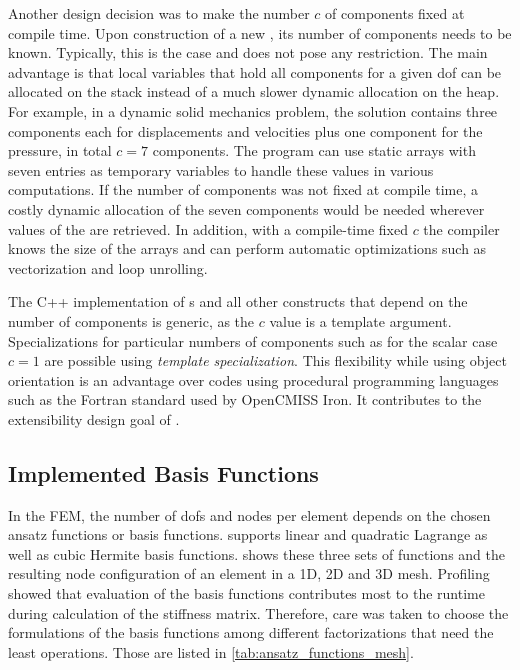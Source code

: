 Another design decision was to make the number $c$ of components fixed at compile time. 
Upon construction of a new , its number of components needs to be known. Typically, this is the case and does not pose any restriction.
The main advantage is that local variables that hold all components for a given dof can be allocated on the stack instead of a much slower dynamic allocation on the heap. For example, in a dynamic solid mechanics problem, the solution  contains three components each for displacements and velocities plus one component for the pressure, in total $c=7$ components. The program can use static arrays with seven entries as temporary variables to handle these values in various computations. If the number of components was not fixed at compile time, a costly dynamic allocation of the seven components would be needed wherever values of the  are retrieved. 
In addition, with a compile-time fixed $c$ the compiler knows the size of the arrays and can perform automatic optimizations such as vectorization and loop unrolling.

The C++ implementation of s and all other constructs that depend on the number of components is generic, as the  $c$ value is a template argument. Specializations for particular numbers of components such as for the scalar case $c=1$ are possible using \emph{template specialization}.
This flexibility while using object orientation is an advantage over codes using procedural programming languages such as the Fortran standard used by OpenCMISS Iron. It contributes to the extensibility design goal of \opendihu.

\subsection{Implemented Basis Functions}

In the FEM, the number of dofs and nodes per element depends on the chosen ansatz functions or basis functions. \Opendihu{} supports linear and quadratic Lagrange as well as cubic Hermite basis functions. 
 shows these three sets of functions and the resulting node configuration of an element in a 1D, 2D and 3D mesh.
Profiling showed that evaluation of the basis functions contributes most to the runtime during calculation of the stiffness matrix. Therefore, care was taken to choose the formulations of the basis functions among different factorizations that need the least operations. Those are listed in \cref{tab:ansatz_functions_mesh}.

